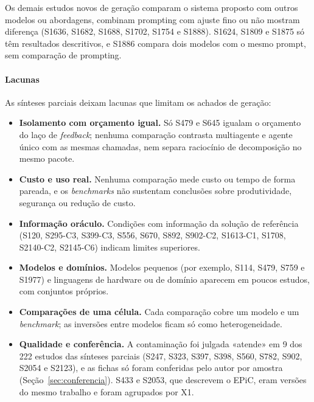 Os demais estudos novos de geração comparam o sistema proposto com outros modelos ou abordagens, combinam prompting
com ajuste fino ou não mostram diferença (S1636, S1682, S1688, S1702, S1754 e S1888). S1624, S1809 e S1875 só têm
resultados descritivos, e S1886 compara dois modelos com o mesmo prompt, sem comparação de prompting.

\paragraph{Lacunas}
As sínteses parciais deixam lacunas que limitam os achados de geração:
\begin{itemize}
\item \textbf{Isolamento com orçamento igual.} Só S479 e S645 igualam o orçamento do laço de \textit{feedback}; nenhuma comparação contrasta multiagente e agente único com as mesmas chamadas, nem separa raciocínio de decomposição no mesmo pacote.
\item \textbf{Custo e uso real.} Nenhuma comparação mede custo ou tempo de forma pareada, e os \textit{benchmarks} não sustentam conclusões sobre produtividade, segurança ou redução de custo.
\item \textbf{Informação oráculo.} Condições com informação da solução de referência (S120, S295-C3, S399-C3, S556, S670, S892, S902-C2, S1613-C1, S1708, S2140-C2, S2145-C6) indicam limites superiores.
\item \textbf{Modelos e domínios.} Modelos pequenos (por exemplo, S114, S479, S759 e S1977) e linguagens de hardware ou de domínio aparecem em poucos estudos, com conjuntos próprios.
\item \textbf{Comparações de uma célula.} Cada comparação cobre um modelo e um \textit{benchmark}; as inversões entre modelos ficam só como heterogeneidade.
\item \textbf{Qualidade e conferência.} A contaminação foi julgada «atende» em 9 dos 222 estudos das sínteses parciais (S247, S323, S397, S398, S560, S782, S902, S2054 e S2123), e as fichas só foram conferidas pelo
autor por amostra (Seção~\ref{sec:conferencia}). S433 e S2053, que descrevem o EPiC, eram versões do mesmo trabalho e foram agrupados por X1.
\end{itemize}
